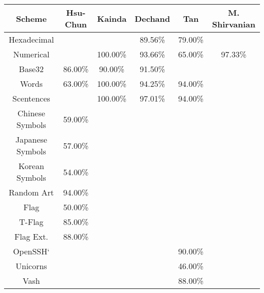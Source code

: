 \begin{tabular}{c|ccccc}
    \toprule
    \textbf{Scheme} 
    & Hsu-Chun\cite{hsiao2009study}      
    & Kainda\cite{kainda2009usability}      
    & Dechand\cite{dechand2016empirical}
    & Tan\cite{tan2017can}      
    & M. Shirvanian\cite{shirvanian2017pitfalls}
    \\\hline
    Hexadecimal     &           &           & 89.56\% & 79.00\% &               \\
    Numerical       &           & 100.00\%  & 93.66\% & 65.00\% & 97.33\%       \\
    Base32          & 86.00\%   & 90.00\%   & 91.50\% &         &               \\
    Words           & 63.00\%   & 100.00\%  & 94.25\% & 94.00\% &               \\
    Scentences      &           & 100.00\%  & 97.01\% & 94.00\% &               \\
    Chinese Symbols & 59.00\%   &           &         &         &               \\
    Japanese Symbols& 57.00\%   &           &         &         &               \\
    Korean Symbols  & 54.00\%   &           &         &         &               \\
    \midrule
    Random Art	     & 94.00\%   &&&&\\
    Flag    	     & 50.00\%   &&&&\\
    T-Flag  	     & 85.00\%   &&&&\\
    Flag Ext.	     & 88.00\%   &&&&\\
    OpenSSH`         &&&& 90.00\% &\\
    Unicorns         &&&& 46.00\% &\\
    Vash             &&&& 88.00\% &\\
    \bottomrule
\end{tabular}